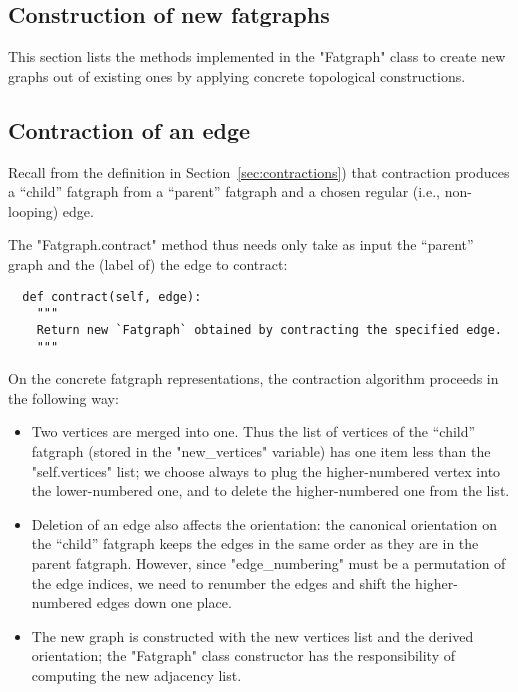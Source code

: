 \subsection{Construction of new fatgraphs}
\label{sec:construction}

This section lists the methods implemented in the "Fatgraph" class to
create new graphs out of existing ones by applying concrete
topological constructions.

\subsection{Contraction of an edge}
\label{sec:contract}

Recall from the definition in Section~\ref{sec:contractions}) that
contraction produces a ``child'' fatgraph from a ``parent'' fatgraph
and a chosen regular (i.e., non-looping) edge. 

The "Fatgraph.contract" method thus needs only take as input the ``parent''
graph and the (label of) the edge to contract:
\begin{lstlisting}
  def contract(self, edge):
    """
    Return new `Fatgraph` obtained by contracting the specified edge.
    """

\end{lstlisting}

On the concrete fatgraph representations, the contraction algorithm
proceeds in the following way:
\begin{itemize}
\item Two vertices are merged into one. Thus the list of vertices of
  the ``child'' fatgraph (stored in the "new_vertices" variable) has
  one item less than the "self.vertices" list; we choose always to
  plug the higher-numbered vertex into the lower-numbered one, and to
  delete the higher-numbered one from the list.
\item Deletion of an edge also affects the orientation: the canonical
  orientation on the ``child'' fatgraph keeps the edges in the same
  order as they are in the parent fatgraph.  However, since
  "edge_numbering" must be a permutation of the edge indices, we need
  to renumber the edges and shift the higher-numbered edges down one
  place.
\item The new graph is constructed with the new vertices list and the
  derived orientation; the "Fatgraph" class constructor has the
  responsibility of computing the new adjacency list. 
\end{itemize}

